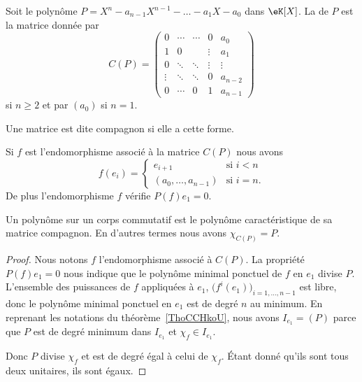 \begin{definition}      \label{DEFooOSVAooGevsda}
    Soit le polynôme \( P=X^n-a_{n-1}X^{n-1}-\ldots-a_1X-a_0\) dans \( \eK[X]\). La  de \( P\) est la matrice donnée par
    \begin{equation}
        C(P)=\begin{pmatrix}
            0    &   \cdots    &   \cdots    &   0    &   a_0\\
            1    &   0    &       &   \vdots    &   a_1\\
            0    &   \ddots    &   \ddots    &   \vdots    &   \vdots\\
            \vdots    &   \ddots    &   \ddots    &   0    &   a_{n-2}\\
            0    &   \cdots    &   0    &   1    &   a_{n-1}
        \end{pmatrix}
    \end{equation}
    si \( n\geq 2\) et par \( (a_0)\) si \( n=1\).

    Une matrice est dite compagnon si elle a cette forme.
\end{definition}

\begin{proposition}
    Si \( f\) est l'endomorphisme associé à la matrice \( C(P)\) nous avons
    \begin{equation}
        f(e_i)=\begin{cases}
            e_{i+1}    &   \text{si } i<n\\
            (a_0,\ldots, a_{n-1})    &    \text{si } i=n.
        \end{cases}
    \end{equation}
    De plus l'endomorphisme \( f\) vérifie \( P(f)e_1=0\).
\end{proposition}

\begin{lemma} \label{LemkVNisk}
    Un polynôme sur un corps commutatif est le polynôme caractéristique de sa matrice compagnon. En d'autres termes nous avons \( \chi_{C(P)}=P\).
\end{lemma}

\begin{proof}
    Nous notons \( f\) l'endomorphisme associé à \( C(P)\). La propriété \( P(f)e_1=0\) nous indique que le polynôme minimal ponctuel de \( f\) en \( e_1\) divise \( P\). L'ensemble des puissances de \( f\) appliquées à \( e_1\), \( \big( f^i(e_1) \big)_{i=1,\ldots, n-1}\) est libre, donc le polynôme minimal ponctuel en \( e_1\) est de degré \( n\) au minimum. En reprenant les notations du théorème~\ref{ThoCCHkoU}, nous avons \( I_{e_1}=(P)\) parce que \( P\) est de degré minimum dans \( I_{e_1}\) et \( \chi_f\in I_{e_1}\).

    Donc \( P\) divise \( \chi_f\) et est de degré égal à celui de \( \chi_f\). Étant donné qu'ils sont tous deux unitaires, ils sont égaux.
\end{proof}

